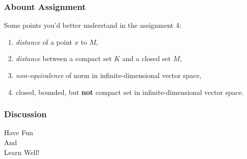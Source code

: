 \documentclass[12pt, t]{beamer}
\renewcommand{\emph}[1]{{\color{Turquoise3}\textsl{#1}}}
\begin{document}
\begin{frame}
    \frametitle{Abount Assignment}
    Some points you'd better understand in the assignment 4:
    \begin{enumerate}
        \item \emph{distance} of a point $x$ to $M$,
        \item \emph{distance} between a compact set $K$ and a closed set $M$,
        \item \emph{non-equivalence} of norm in infinite-dimensional vector space,
        \item closed, bounded, but \textbf{not} compact set in  infinite-dimensional vector space.
    \end{enumerate}
\end{frame}


\begin{frame}
    \frametitle{Discussion}
    \vspace{1cm}
    \begin{center}
        \LARGE
        Have Fun\\
        And\\
        Learn Well!
    \end{center}


\end{frame}
\end{document}
